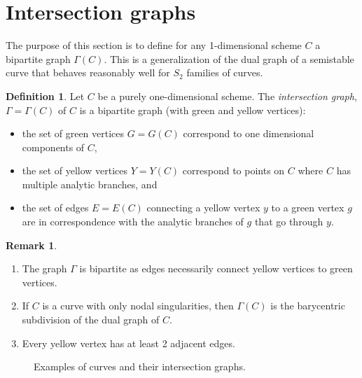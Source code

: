 \documentclass[JEP,XML,SOM,Unicode,NoFloatCountersInSection,published]{cedram}
\theoremstyle{plain}
\theoremstyle{definition}
\newtheorem{remark}[theorem]{Remark}
\newtheorem{definition}[theorem]{Definition}
\begin{document}
\section{Intersection graphs}\label{sec:dualgraphs}

The purpose of this section is to define for any 1-dimensional scheme $C$ a bipartite graph $\Gamma(C)$. This is a generalization of the dual graph of a semistable curve that behaves reasonably well for $S_2$ families of curves.

\begin{definition}
Let $C$ be a purely one-dimensional scheme. The \textit{intersection graph}, $\Gamma=\Gamma(C)$ of $C$ is a bipartite graph (with green and yellow vertices):
\begin{itemize}
\item the set of green vertices $G=G(C)$ correspond to one dimensional components of $C$,
\item the set of yellow vertices $Y=Y(C)$ correspond to points on $C$ where $C$ has multiple analytic branches, and
\item the set of edges $E=E(C)$ connecting a yellow vertex $y$ to a green vertex $g$ are in correspondence with the analytic branches of $g$ that go through $y$.
\end{itemize}
\end{definition}

\skpt
\begin{remark}
\begin{enumerate}
\item The graph $\Gamma$ is bipartite as edges necessarily connect yellow vertices to green vertices.
\item If $C$ is a curve with only nodal singularities, then $\Gamma(C)$ is the barycentric subdivision of the dual graph of $C$.
\item Every yellow vertex has at least 2 adjacent edges.
\end{enumerate}
\end{remark}

\begin{figure}[htb]
\begin{center}
\caption{Examples of curves and their intersection graphs.}
\end{center}
\end{figure}
\end{document}
